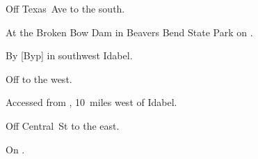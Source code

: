 
\begin{LocationList}

Off Texas~Ave to the south.

At the Broken Bow Dam in Beavers Bend State Park on .

By [Byp] in southwest Idabel.

Off   to the west.

Accessed from , 10~miles west of Idabel.

Off Central~St to the east.

\Location{\TruckStop \Gas \Rest}
On  .

\end{LocationList}
